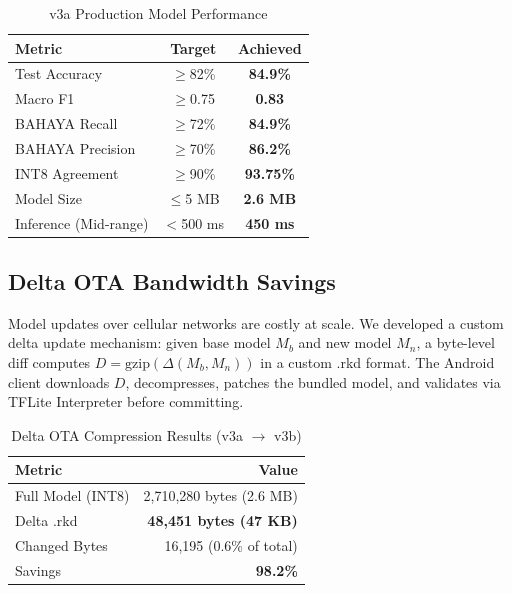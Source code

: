 \documentclass[conference]{IEEEtran}
\begin{document}
\begin{table}[h]
	\centering
	\caption{v3a Production Model Performance}
	\label{tab:performance}
	\begin{tabular}{lcc}
		\toprule
		Metric                & Target     & Achieved         \\
		\midrule
		Test Accuracy         & $\geq$82\% & \textbf{84.9\%}  \\
		Macro F1              & $\geq$0.75 & \textbf{0.83}    \\
		BAHAYA Recall         & $\geq$72\% & \textbf{84.9\%}  \\
		BAHAYA Precision      & $\geq$70\% & \textbf{86.2\%}  \\
		INT8 Agreement        & $\geq$90\% & \textbf{93.75\%} \\
		Model Size            & $\leq$5 MB & \textbf{2.6 MB}  \\
		Inference (Mid-range) & $<$500 ms  & \textbf{450 ms}  \\
		\bottomrule
	\end{tabular}
\end{table}

\subsection{Delta OTA Bandwidth Savings}

Model updates over cellular networks are costly at scale. We developed a custom delta update mechanism: given base model $M_b$ and new model $M_n$, a byte-level diff computes $D = \text{gzip}(\Delta(M_b, M_n))$ in a custom .rkd format. The Android client downloads $D$, decompresses, patches the bundled model, and validates via TFLite Interpreter before committing.

\begin{table}[h]
	\centering
	\caption{Delta OTA Compression Results (v3a $\rightarrow$ v3b)}
	\label{tab:delta}
	\begin{tabular}{lr}
		\toprule
		Metric            & Value                         \\
		\midrule
		Full Model (INT8) & 2,710,280 bytes (2.6 MB)      \\
		Delta .rkd        & \textbf{48,451 bytes (47 KB)} \\
		Changed Bytes     & 16,195 (0.6\% of total)       \\
		Savings           & \textbf{98.2\%}               \\
		\bottomrule
	\end{tabular}
\end{table}
\end{document}
